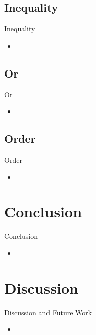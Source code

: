 \documentclass[18pt]{beamer}
\begin{document}
	\subsection{Inequality}
		\begin{frame}{Inequality}
		
			\begin{itemize}
			\item
			\end{itemize}
		
		\end{frame}
	
	\subsection{Or}
		\begin{frame}{Or}
		
			\begin{itemize}
			\item
			\end{itemize}
		
		\end{frame}
	
	\subsection{Order}
		\begin{frame}{Order}
		
			\begin{itemize}
			\item
			\end{itemize}
		
		\end{frame}
	
\section{Conclusion}
	\begin{frame}{Conclusion}
	
		\begin{itemize}
			\item
		\end{itemize}
	
	\end{frame}

\section{Discussion}
	\begin{frame}{Discussion and Future Work}
	
		\begin{itemize}
			\item
		\end{itemize}
	
	\end{frame}
\end{document}
